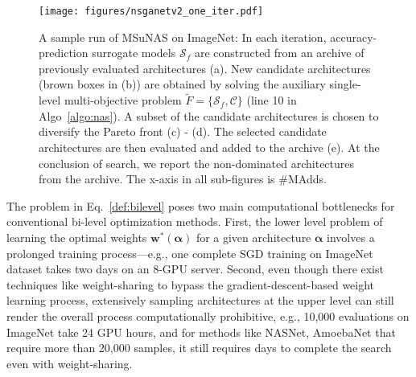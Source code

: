 \documentclass[runningheads]{llncs}
\def\ourmethod{MSuNAS}
\begin{document}
\begin{figure}[!t]
\begin{minipage}{.43\textwidth}
\begin{center}
{{        }}
        \end{center}
    \end{minipage}\hfill
    \begin{minipage}{0.57\textwidth}
        \centering
        \texttt{[image: figures/nsganetv2\_one\_iter.pdf]}
    \end{minipage}
    \caption{A sample run of \ourmethod{} on ImageNet: In each iteration, accuracy-prediction surrogate models $\mathcal{S}_f$ are constructed from an archive of previously evaluated architectures (a). New candidate architectures \big(brown boxes in (b)\big) are obtained by solving the auxiliary single-level multi-objective problem $\tilde{F} = \{\mathcal{S}_f, \mathcal{C}\}$ (line 10 in Algo~\ref{algo:nas}). A subset of the candidate architectures is chosen to diversify the Pareto front (c) - (d). The selected candidate architectures are then evaluated and added to the archive (e). At the conclusion of search, we report the non-dominated architectures from the archive. The x-axis in all sub-figures is \#MAdds.
    \label{fig:algo}}
\end{figure}
The problem in Eq.~\ref{def:bilevel} poses two main computational bottlenecks for conventional bi-level optimization methods. First, the lower level problem of learning the optimal weights $\bm{w}^*(\bm{\alpha})$ for a given architecture $\bm{\alpha}$ involves a prolonged training process---e.g., one complete SGD training on ImageNet dataset takes two days on an 8-GPU server. Second, even though there exist techniques like weight-sharing to bypass the gradient-descent-based weight learning process, extensively sampling architectures at the upper level can still render the overall process computationally prohibitive, e.g., 10,000 evaluations on ImageNet take 24 GPU hours, and for methods like NASNet, AmoebaNet that require more than 20,000 samples, it still requires days to complete the search even with weight-sharing.
\end{document}
